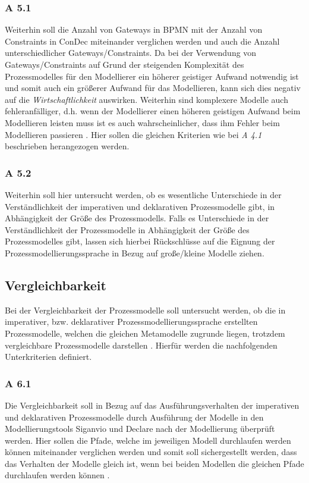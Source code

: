 \subsubsection{A 5.1}
Weiterhin soll die Anzahl von Gateways in BPMN mit der Anzahl von Constraints in ConDec miteinander verglichen werden und auch die Anzahl unterschiedlicher Gateways/Constraints. Da bei der Verwendung von Gateways/Constraints auf Grund der steigenden Komplexität des Prozessmodelles für den Modellierer ein höherer geistiger Aufwand notwendig ist und somit auch ein größerer Aufwand für das Modellieren, kann sich dies negativ auf die \textit{Wirtschaftlichkeit} auswirken. Weiterhin sind komplexere Modelle auch fehleranfälliger, d.h. wenn der Modellierer einen höheren geistigen Aufwand beim Modellieren leisten muss ist es auch wahrscheinlicher, dass ihm Fehler beim Modellieren passieren \cite{freund2007, journals95, leimeister2012,mendling2010seven}.
Hier sollen die gleichen Kriterien wie bei \textit{A 4.1} beschrieben herangezogen werden.


\subsubsection{A 5.2}
Weiterhin soll hier untersucht werden, ob es wesentliche Unterschiede in der Verständlichkeit der imperativen und deklarativen Prozessmodelle gibt, in Abhängigkeit der Größe des Prozessmodells. Falls es Unterschiede in der Verständlichkeit der Prozessmodelle in Abhängigkeit der Größe des Prozessmodelles gibt, lassen sich hierbei Rückschlüsse auf die Eignung der Prozessmodellierungssprache in Bezug auf große/kleine Modelle ziehen.


\subsection{Vergleichbarkeit}
Bei der Vergleichbarkeit der Prozessmodelle soll untersucht werden, ob die in imperativer, bzw. deklarativer Prozessmodellierungssprache erstellten Prozessmodelle, welchen die gleichen Metamodelle zugrunde liegen, trotzdem vergleichbare Prozessmodelle darstellen \cite{freund2007, journals95, leimeister2012}. Hierfür werden die nachfolgenden Unterkriterien definiert.

\subsubsection{A 6.1}
Die Vergleichbarkeit soll in Bezug auf das Ausführungsverhalten der imperativen und deklarativen Prozessmodelle durch Ausführung der Modelle in den Modellierungstools Siganvio und Declare nach der Modellierung überprüft werden. Hier sollen die Pfade, welche im jeweiligen Modell durchlaufen werden können miteinander verglichen werden und somit soll sichergestellt werden, dass das Verhalten der Modelle gleich ist, wenn bei beiden Modellen die gleichen Pfade durchlaufen werden können \cite{haisjackl2014understanding}.

